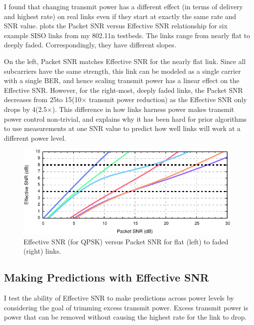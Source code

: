 I found that changing transmit power has a different effect (in terms of delivery and highest rate) on real links even if they start at exactly the same rate and SNR value.  plots the Packet SNR versus Effective SNR relationship for six example SISO links from my 802.11n testbeds. The links range from nearly flat to deeply faded. Correspondingly, they have different slopes.

On the left, Packet SNR matches Effective SNR for the nearly flat link. Since all subcarriers have the same strength, this link can be modeled as a single carrier with a single BER, and hence scaling transmit power has a linear effect on the Effective SNR. However, for the right-most, deeply faded links, the Packet SNR decreases from 25\dB to 15\dB (10$\times$ transmit power reduction) as the Effective SNR only drops by 4\dB (2.5$\times$). This difference in how links harness power makes transmit power control non-trivial, and explains why it has been hard for prior algorithms to use measurements at one SNR value to predict how well links will work at a different power level.

\begin{figure}[t]
  \centering
  \includegraphics[width=\textwidth]{figures/eff_vs_snr_qpsk.pdf}
  \caption[Effective SNR vs Packet SNR for four faded links]{Effective SNR (for QPSK) versus Packet SNR for flat (left) to faded (right) links.}
  \label{fig:eff_vs_rssi}
\end{figure}

\subsection{Making Predictions with Effective SNR}
I test the ability of Effective SNR to make predictions across power levels by considering the goal of trimming excess transmit power. Excess transmit power is power that can be removed without causing the highest rate for the link to drop.

